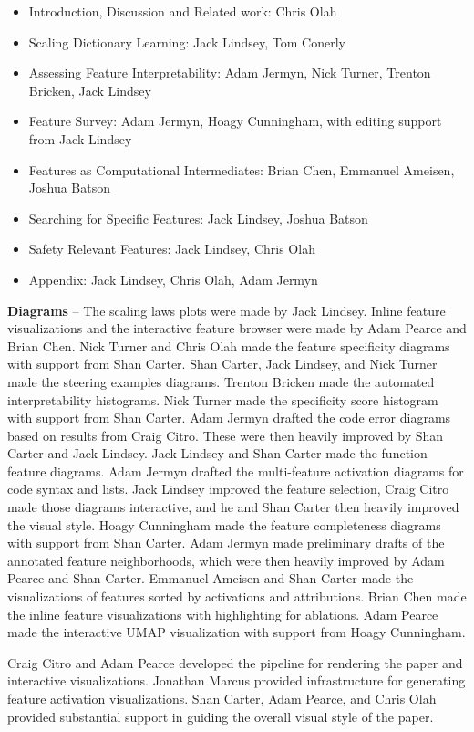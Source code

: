 \documentclass{article}
\begin{document}
\begin{itemize}
    \item Introduction, Discussion and Related work: Chris Olah
    \item Scaling Dictionary Learning: Jack Lindsey, Tom Conerly
    \item Assessing Feature Interpretability: Adam Jermyn, Nick Turner, Trenton Bricken, Jack Lindsey
    \item Feature Survey: Adam Jermyn, Hoagy Cunningham, with editing support from Jack Lindsey
    \item Features as Computational Intermediates: Brian Chen, Emmanuel Ameisen, Joshua Batson
    \item Searching for Specific Features: Jack Lindsey, Joshua Batson
    \item Safety Relevant Features: Jack Lindsey, Chris Olah
    \item Appendix: Jack Lindsey, Chris Olah, Adam Jermyn
\end{itemize}

\textbf{Diagrams} -- The scaling laws plots were made by Jack Lindsey. Inline feature visualizations and the interactive feature browser were made by Adam Pearce and Brian Chen. Nick Turner and Chris Olah made the feature specificity diagrams with support from Shan Carter. Shan Carter, Jack Lindsey, and Nick Turner made the steering examples diagrams. Trenton Bricken made the automated interpretability histograms. Nick Turner made the specificity score histogram with support from Shan Carter. Adam Jermyn drafted the code error diagrams based on results from Craig Citro. These were then heavily improved by Shan Carter and Jack Lindsey. Jack Lindsey and Shan Carter made the function feature diagrams. Adam Jermyn drafted the multi-feature activation diagrams for code syntax and lists. Jack Lindsey improved the feature selection, Craig Citro made those diagrams interactive, and he and Shan Carter then heavily improved the visual style. Hoagy Cunningham made the feature completeness diagrams with support from Shan Carter. Adam Jermyn made preliminary drafts of the annotated feature neighborhoods, which were then heavily improved by Adam Pearce and Shan Carter. Emmanuel Ameisen and Shan Carter made the visualizations of features sorted by activations and attributions. Brian Chen made the inline feature visualizations with highlighting for ablations. Adam Pearce made the interactive UMAP visualization with support from Hoagy Cunningham.

Craig Citro and Adam Pearce developed the pipeline for rendering the paper and interactive visualizations. Jonathan Marcus provided infrastructure for generating feature activation visualizations. Shan Carter, Adam Pearce, and Chris Olah provided substantial support in guiding the overall visual style of the paper.
\end{document}
